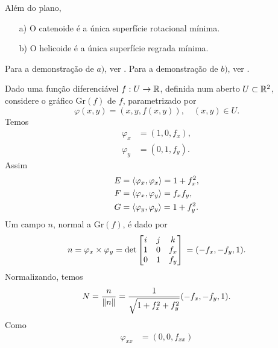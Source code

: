 \begin{teorema}
	Além do plano,
	\begin{enumerate}
		\item[a)] O catenoide é a única superfície rotacional mínima.
		\item[b)] O helicoide é a única superfície regrada mínima.
	\end{enumerate}
\end{teorema}

\begin{demonstracao}
	Para a demonstração de $a)$, ver \cite[§3.5, Exemplo 5]{Carmo2010}. 
	Para a demonstração de $b)$, ver \cite[§3.5, Exemplo 6]{Carmo2010}.
\end{demonstracao}

\begin{exemplo}
	Dado uma função diferenciável $f: U \rightarrow \mathbb{R}$, definida num aberto $U \subset \mathbb{R}^2$, considere o gráfico $\text{Gr}(f)$ de $f$, parametrizado por
	\begin{equation*}
	\varphi(x,y) = (x,y,f(x,y)), \quad (x,y) \in U.
	\end{equation*}
	Temos
	\begin{align*}
	\varphi_x &= (1,0,f_x),\\
	\varphi_y &= (0,1,f_y).
	\end{align*}
	Assim
	\begin{align*}
	E &= \left\langle \varphi_x,\varphi_x \right\rangle = 1 + f_x^2,\\
	F &= \left\langle \varphi_x,\varphi_y \right\rangle = f_x f_y,\\
	G &= \left\langle \varphi_y,\varphi_y \right\rangle = 1 + f_y^2.
	\end{align*}
	Um campo $n$, normal a $\text{Gr}(f)$, é dado por
	\begin{equation*}
	n = \varphi_x \times \varphi_y = \det \left[ \begin{matrix}
	i & j & k\\
	1 & 0 & f_x\\
	0 & 1 & f_y
	\end{matrix} \right]\\
	= (-f_x, -f_y, 1).
	\end{equation*}
	Normalizando, temos
	\begin{equation*}
	N = \frac{n}{\left\| n \right\|} = \frac{1}{\sqrt{1 + f_x^2 + f_y^2}}(-f_x, -f_y, 1).
	\end{equation*}
	Como
	\begin{align*}
	\varphi_{xx} &= (0, 0, f_{xx})\\

\end{align*}
\end{exemplo}
